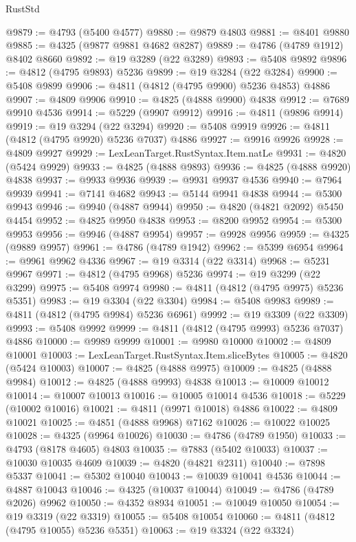 \begin{lexlean}{RustStd}
\begin{coremodule}
{\begin{coremodule}
{{{{{{{{{{{{{{{{{{{{{{{{{{{{{{{{{{{{{{{{{{{{{{{{{{{{{{{{{{{{{{{{{{{{{{{{{{{{{{{{@9879 := @4793 (@5400 @4577)
@9880 := @9879 @4803
@9881 := @8401 @9880
@9885 := @4325 (@9877 @9881 @4682 @8287)
@9889 := @4786 (@4789 @1912) @8402 @8660
@9892 := @19 @3289 (@22 @3289)
@9893 := @5408 @9892
@9896 := @4812 (@4795 @9893) @5236
@9899 := @19 @3284 (@22 @3284)
@9900 := @5408 @9899
@9906 := @4811 (@4812 (@4795 @9900) @5236 @4853) @4886
@9907 := @4809 @9906
@9910 := @4825 (@4888 @9900) @4838
@9912 := @7689 @9910 @4536
@9914 := @5229 (@9907 @9912)
@9916 := @4811 (@9896 @9914)
@9919 := @19 @3294 (@22 @3294)
@9920 := @5408 @9919
@9926 := @4811 (@4812 (@4795 @9920) @5236 @7037) @4886
@9927 := @9916 @9926
@9928 := @4809 @9927
@9929 := LexLeanTarget.RustSyntax.Item.natLe
@9931 := @4820 (@5424 @9929)
@9933 := @4825 (@4888 @9893)
@9936 := @4825 (@4888 @9920) @4838
@9937 := @9933 @9936
@9939 := @9931 @9937 @4536
@9940 := @7964 @9939
@9941 := @7141 @4682
@9943 := @5144 @9941 @4838
@9944 := @5300 @9943
@9946 := @9940 (@4887 @9944)
@9950 := @4820 (@4821 @2092) @5450 @4454
@9952 := @4825 @9950 @4838
@9953 := @8200 @9952
@9954 := @5300 @9953
@9956 := @9946 (@4887 @9954)
@9957 := @9928 @9956
@9959 := @4325 (@9889 @9957)
@9961 := @4786 (@4789 @1942)
@9962 := @5399 @6954
@9964 := @9961 @9962 @4336
@9967 := @19 @3314 (@22 @3314)
@9968 := @5231 @9967
@9971 := @4812 (@4795 @9968) @5236
@9974 := @19 @3299 (@22 @3299)
@9975 := @5408 @9974
@9980 := @4811 (@4812 (@4795 @9975) @5236 @5351)
@9983 := @19 @3304 (@22 @3304)
@9984 := @5408 @9983
@9989 := @4811 (@4812 (@4795 @9984) @5236 @6961)
@9992 := @19 @3309 (@22 @3309)
@9993 := @5408 @9992
@9999 := @4811 (@4812 (@4795 @9993) @5236 @7037) @4886
@10000 := @9989 @9999
@10001 := @9980 @10000
@10002 := @4809 @10001
@10003 := LexLeanTarget.RustSyntax.Item.sliceBytes
@10005 := @4820 (@5424 @10003)
@10007 := @4825 (@4888 @9975)
@10009 := @4825 (@4888 @9984)
@10012 := @4825 (@4888 @9993) @4838
@10013 := @10009 @10012
@10014 := @10007 @10013
@10016 := @10005 @10014 @4536
@10018 := @5229 (@10002 @10016)
@10021 := @4811 (@9971 @10018) @4886
@10022 := @4809 @10021
@10025 := @4851 (@4888 @9968) @7162
@10026 := @10022 @10025
@10028 := @4325 (@9964 @10026)
@10030 := @4786 (@4789 @1950)
@10033 := @4793 (@8178 @4605) @4803
@10035 := @7883 (@5402 @10033)
@10037 := @10030 @10035 @4609
@10039 := @4820 (@4821 @2311)
@10040 := @7898 @5337
@10041 := @5302 @10040
@10043 := @10039 @10041 @4536
@10044 := @4887 @10043
@10046 := @4325 (@10037 @10044)
@10049 := @4786 (@4789 @2026) @9962
@10050 := @4352 @8934
@10051 := @10049 @10050
@10054 := @19 @3319 (@22 @3319)
@10055 := @5408 @10054
@10060 := @4811 (@4812 (@4795 @10055) @5236 @5351)
@10063 := @19 @3324 (@22 @3324)
}}}}}}}}}}}}}}}}}}}}}}}}}}}}}}}}}}}}}}}}}}}}}}}}}}}}}}}}}}}}}}}}}}}}}}}}}}}}}}}}
\end{coremodule}}
\end{coremodule}
\end{lexlean}
